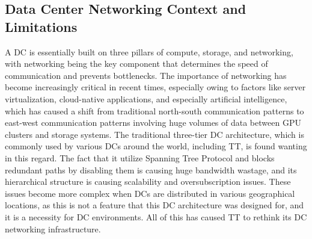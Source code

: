 \subsection{Data Center Networking Context and Limitations}
A DC is essentially built on three pillars of compute, storage, and networking, with networking being the key component that determines the speed of communication and prevents bottlenecks. The importance of networking has become increasingly critical in recent times, especially owing to factors like server virtualization, cloud-native applications, and especially artificial intelligence, which has caused a shift from traditional north-south communication patterns to east-west communication patterns involving huge volumes of data between GPU clusters and storage systems. The traditional three-tier DC architecture, which is commonly used by various DCs around the world, including TT, is found wanting in this regard. The fact that it utilize Spanning Tree Protocol and blocks redundant paths by disabling them is causing huge bandwidth wastage, and its hierarchical structure is causing scalability and oversubscription issues. These issues become more complex when DCs are distributed in various geographical locations, as this is not a feature that this DC architecture was designed for, and it is a necessity for DC environments. All of this has caused TT to rethink its DC networking infrastructure.

